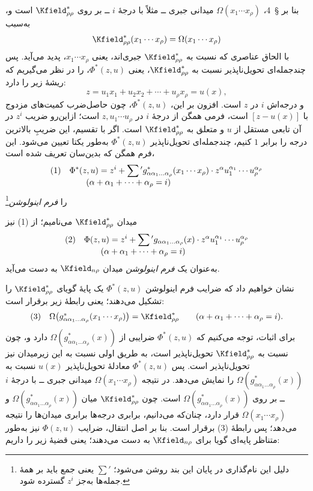 \documentclass[11pt]{article}
\newcommand{\srcLTR}[1]{\relax\ifmmode\text{\mbox{\babelsublr{\foreignlanguage{english}{#1}}}}\else\babelsublr{\foreignlanguage{english}{#1}}\fi}
\newcommand{\srcfn}[2]{\begingroup\renewcommand{\thefootnote}{\srcLTR{#1}}\footnote{#2}\addtocounter{footnote}{-1}\endgroup}
\begin{document}
بنا بر \S\ 4، $\Omega(x_1\cdots x_\rho)$ میدانی جبری ــ مثلاً با درجهٔ $i$ ــ بر روی $\Kfield^*_{\rho\rho}$ است و، به‌سبب
\[
\Kfield^*_{\rho\rho}(x_1\cdots x_\rho)=\Omega(x_1\cdots x_\rho)
\]
با الحاق عناصری که نسبت به $\Kfield^*_{\rho\rho}$ جبری‌اند، یعنی $x_1\cdots x_\rho$، پدید می‌آید. پس چندجمله‌ای تحویل‌ناپذیر نسبت به $\Kfield^*_{\rho\rho}$، یعنی $\Phi^*(z,u)$، را در نظر می‌گیریم که ریشهٔ زیر را دارد:
\[
z=u_1x_1+u_2x_2+\cdots+u_\rho x_\rho=u(x),
\]
و درجه‌اش $i$ در $z$ است. افزون بر این، $\Phi^*(z,u)$، چون حاصل‌ضرب کمیت‌های مزدوج با $[z-u(x)]$ است، فرمی همگن از درجهٔ $i$ در $z,u_1\cdots u_\rho$ است؛ ازاین‌رو ضریب $z^i$ در آن تابعی مستقل از $u$ و متعلق به $\Kfield^*_{\rho\rho}$ است. اگر با تقسیم، این ضریبِ بالاترین درجه را برابر $1$ کنیم، چندجمله‌ای تحویل‌ناپذیر $\Phi^*(z,u)$ به‌طور یکتا تعیین می‌شود. این فرم همگن که بدین‌سان تعریف شده است،
\[
\begin{array}{@{}l@{\quad}l@{}}
(1)& \displaystyle \Phi^*(z,u)=z^i+\sum{}'g^*_{\alpha\alpha_1\ldots\alpha_\rho}(x_1\cdots x_\rho)\cdot
z^\alpha u_1^{\alpha_1}\cdots u_\rho^{\alpha_\rho}\\
& \displaystyle\qquad(\alpha+\alpha_1+\cdots+\alpha_\rho=i)
\end{array}
\]
را \emph{فرم اینولوشن}\srcfn{*)}{دلیل این نام‌گذاری در پایان این بند روشن می‌شود؛ $\sum'$ یعنی جمع باید بر همهٔ جمله‌ها به‌جز $z^i$ گسترده شود.} میدان $\Kfield^*_{\rho\rho}$ می‌نامیم؛ از (1) نیز
\[
\begin{array}{@{}l@{\quad}l@{}}
(2)& \displaystyle \Phi(z,u)=z^i+\sum{}'g_{\alpha\alpha_1\ldots\alpha_\rho}(x)\cdot
z^\alpha u_1^{\alpha_1}\cdots u_\rho^{\alpha_\rho}\\
& \displaystyle\qquad(\alpha+\alpha_1+\cdots+\alpha_\rho=i)
\end{array}
\]
به‌عنوان یک \emph{فرم اینولوشن} میدان $\Kfield_{n\rho}$ به دست می‌آید.



نشان خواهیم داد که ضرایب فرم اینولوشن $\Phi^*(z,u)$ یک پایهٔ گویای $\Kfield^*_{\rho\rho}$ را تشکیل می‌دهند؛ یعنی رابطهٔ زیر برقرار است:
\[
\begin{array}{@{}l@{\quad}c@{}}
(3)& \Omega\bigl(g^*_{\alpha\alpha_1\ldots\alpha_\rho}(x_1\cdots x_\rho)\bigr)=\Kfield^*_{\rho\rho}\qquad(\alpha+\alpha_1+\cdots+\alpha_\rho=i).
\end{array}
\]
برای اثبات، توجه می‌کنیم که $\Phi^*(z,u)$ ضرایبی از $\Omega(g^*_{\alpha\alpha_1\ldots\alpha_\rho}(x))$ دارد و، چون نسبت به $\Kfield^*_{\rho\rho}$ تحویل‌ناپذیر است، به طریق اولی نسبت به این زیرمیدان نیز تحویل‌ناپذیر است. پس $\Phi^*(z,u)$ معادلهٔ تحویل‌ناپذیر $u(x)$ نسبت به $\Omega(g^*_{\alpha\alpha_1\ldots\alpha_\rho}(x))$ را نمایش می‌دهد. در نتیجه $\Omega(x_1\cdots x_\rho)$ میدانی جبری ــ با درجهٔ $i$ ــ بر روی $\Omega(g^*_{\alpha\alpha_1\ldots\alpha_\rho}(x))$ است. چون $\Kfield^*_{\rho\rho}$ میان $\Omega(g^*_{\alpha\alpha_1\ldots\alpha_\rho}(x))$ و$\Omega(x_1\cdots x_\rho)$ قرار دارد، چنان‌که می‌دانیم، برابری درجه‌ها برابری میدان‌ها را نتیجه می‌دهد؛ پس رابطهٔ (3) برقرار است. بنا بر اصل انتقال، ضرایب $\Phi(z,u)$ نیز به‌طور متناظر پایه‌ای گویا برای $\Kfield_{n\rho}$ به دست می‌دهند؛ یعنی قضیهٔ زیر را داریم:
\end{document}
